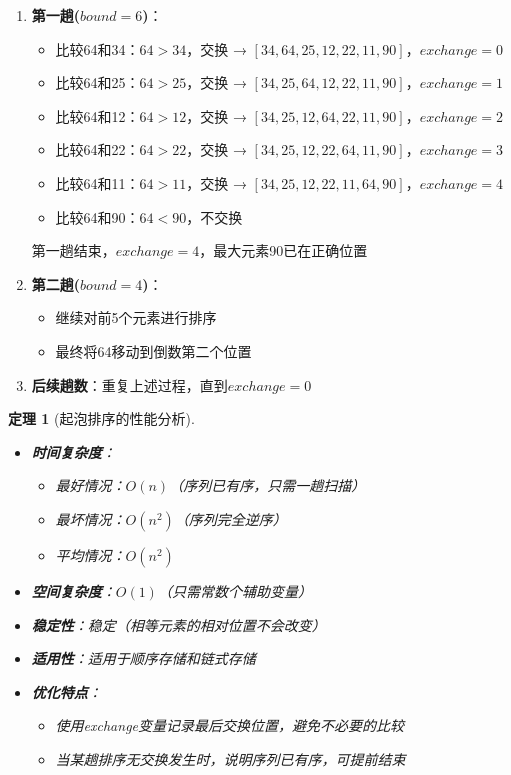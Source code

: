 \documentclass[12pt,a4paper]{amsart}
\newtheorem{theorem}{定理}[section]
\begin{document}
\begin{enumerate}
\item \textbf{第一趟($bound=6$)}：
    \begin{itemize}
    \item 比较64和34：$64>34$，交换 → $[34, 64, 25, 12, 22, 11, 90]$，$exchange=0$
    \item 比较64和25：$64>25$，交换 → $[34, 25, 64, 12, 22, 11, 90]$，$exchange=1$
    \item 比较64和12：$64>12$，交换 → $[34, 25, 12, 64, 22, 11, 90]$，$exchange=2$
    \item 比较64和22：$64>22$，交换 → $[34, 25, 12, 22, 64, 11, 90]$，$exchange=3$
    \item 比较64和11：$64>11$，交换 → $[34, 25, 12, 22, 11, 64, 90]$，$exchange=4$
    \item 比较64和90：$64<90$，不交换
    \end{itemize}
    第一趟结束，$exchange=4$，最大元素90已在正确位置

\item \textbf{第二趟($bound=4$)}：
    \begin{itemize}
    \item 继续对前5个元素进行排序
    \item 最终将64移动到倒数第二个位置
    \end{itemize}

\item \textbf{后续趟数}：重复上述过程，直到$exchange=0$
\end{enumerate}

\begin{theorem}[起泡排序的性能分析]
\indent
\begin{itemize}
\item \textbf{时间复杂度}：
    \begin{itemize}
    \item 最好情况：$O(n)$（序列已有序，只需一趟扫描）
    \item 最坏情况：$O(n^2)$（序列完全逆序）
    \item 平均情况：$O(n^2)$
    \end{itemize}
\item \textbf{空间复杂度}：$O(1)$（只需常数个辅助变量）
\item \textbf{稳定性}：稳定（相等元素的相对位置不会改变）
\item \textbf{适用性}：适用于顺序存储和链式存储
\item \textbf{优化特点}：
    \begin{itemize}
    \item 使用exchange变量记录最后交换位置，避免不必要的比较
    \item 当某趟排序无交换发生时，说明序列已有序，可提前结束
    \end{itemize}
\end{itemize}
\end{theorem}
\end{document}
